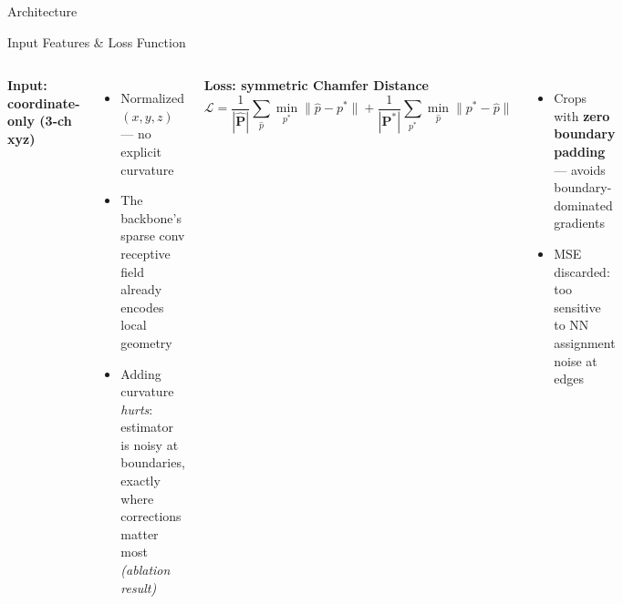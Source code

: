 \documentclass[aspectratio=169]{beamer}
\begin{document}
\begin{frame}{Architecture}
{%
  }
\end{frame}

\begin{frame}{Input Features \& Loss Function}
  \begin{columns}[T]
    \textbf{Input: coordinate-only (3-ch xyz)}
    \begin{itemize}
      \item Normalized $(x,y,z)$ — no explicit curvature
      \item The backbone's sparse conv receptive field already encodes local geometry
      \item Adding curvature \emph{hurts}: estimator is noisy at boundaries,
            exactly where corrections matter most \emph{(ablation result)}
    \end{itemize}

    \textbf{Loss: symmetric Chamfer Distance}
    \[
      \mathcal{L} = \frac{1}{|\hat{\mathbf{P}}|}\sum_{\hat{p}} \min_{p^*}\|\hat{p}-p^*\|
                  + \frac{1}{|\mathbf{P}^*|}\sum_{p^*} \min_{\hat{p}}\|p^*-\hat{p}\|
    \]
    \begin{itemize}
      \item Crops with \textbf{zero boundary padding} — avoids boundary-dominated gradients
      \item MSE discarded: too sensitive to NN assignment noise at edges
    \end{itemize}
  \end{columns}
\end{frame}
\end{document}

